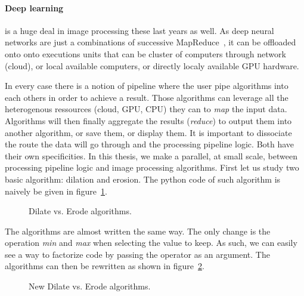 \paragraph{Deep learning} is a huge deal in image processing these last years as well. As deep neural networks are just
a combinations of successive MapReduce~\parencite{dean.2008.mapreduce}, it can be offloaded onto onto executions units
that can be cluster of computers through network (cloud), or local available computers, or directly localy available GPU
hardware.

In every case there is a notion of pipeline where the user pipe algorithms into each others in order to achieve a
result. Those algorithms can leverage all the heterogenous ressources (cloud, GPU, CPU) they can to \emph{map} the input
data. Algorithms will then finally aggregate the results (\emph{reduce}) to output them into another algorithm, or save
them, or display them. It is important to dissociate the route the data will go through and the processing pipeline
logic. Both have their own specificities. In this thesis, we make a parallel, at small scale, between processing
pipeline logic and image processing algorithms. First let us study two basic algorithm: dilation and erosion. The python
code of such algorithm is naively be given in figure~\ref{fig.erode.dilate}.

\begin{figure}[tbh]
  \centering
  \hfil
  \caption{Dilate vs. Erode algorithms.}
  \label{fig.erode.dilate}
\end{figure}

The algorithms are almost written the same way. The only change is the operation \emph{min} and \emph{max} when
selecting the value to keep. As such, we can easily see a way to factorize code by passing the operator as an argument.
The algorithms can then be rewritten as shown in figure~\ref{fig.erode.dilate.factorized}.

\begin{figure}[tbh]
  \centering
  \vfil
  \smallskip
  \hfil
  \caption{New Dilate vs. Erode algorithms.}
  \label{fig.erode.dilate.factorized}
\end{figure}

